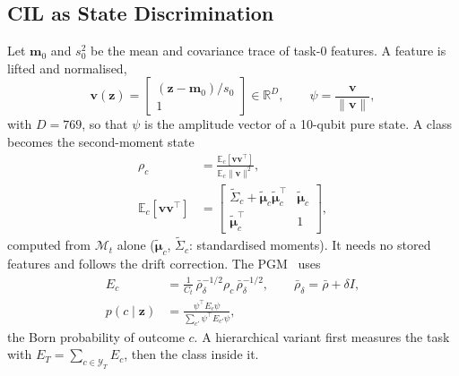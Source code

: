 \subsection{CIL as State Discrimination}
\label{sec:qsd}
Let $\mathbf m_0$ and $s_0^2$ be the mean and covariance trace of task-0
features. A feature is lifted and normalised,
\begin{equation}
  \mathbf v(\mathbf z)=\begin{bmatrix}(\mathbf z-\mathbf m_0)/s_0\\1\end{bmatrix}\in\mathbb R^{D},\qquad
  \psi=\frac{\mathbf v}{\|\mathbf v\|},
  \label{eq:lift}
\end{equation}
with $D=769$, so that $\psi$ is the amplitude vector of a 10-qubit pure state.
A class becomes the second-moment state
\begin{equation}
  \begin{aligned}
  \rho_c&=\frac{\mathbb E_c[\mathbf v\mathbf v^{\top}]}{\mathbb E_c\|\mathbf v\|^2},\\
  \mathbb E_c[\mathbf v\mathbf v^{\top}]&=
  \begin{bmatrix}\tilde\Sigma_c+\tilde{\boldsymbol\mu}_c\tilde{\boldsymbol\mu}_c^{\top} & \tilde{\boldsymbol\mu}_c\\
  \tilde{\boldsymbol\mu}_c^{\top}&1\end{bmatrix},
  \end{aligned}
  \label{eq:state}
\end{equation}
computed from $\mathcal M_t$ alone ($\tilde{\boldsymbol\mu}_c$, $\tilde\Sigma_c$:
standardised moments). It needs no stored features and follows the drift
correction. The PGM~\citep{hausladen1994pgm} uses
\begin{equation}
  \begin{aligned}
  E_c&=\frac1{C_t}\,\bar\rho_\delta^{-1/2}\rho_c\,\bar\rho_\delta^{-1/2},\qquad
  \bar\rho_\delta=\bar\rho+\delta I,\\
  p(c\mid\mathbf z)&=\frac{\psi^{\top}E_c\psi}{\sum_{c'}\psi^{\top}E_{c'}\psi},
  \end{aligned}
  \label{eq:pgm}
\end{equation}
the Born probability of outcome $c$. A hierarchical variant first measures
the task with $E_T=\sum_{c\in\mathcal Y_T}E_c$, then the class inside it.


